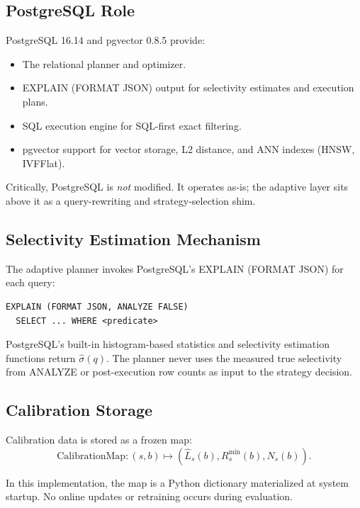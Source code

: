 \documentclass[10pt,twocolumn]{article}
\begin{document}
\subsection{PostgreSQL Role}

PostgreSQL 16.14 and pgvector 0.8.5 provide:
\begin{itemize}
\item The relational planner and optimizer.
\item EXPLAIN (FORMAT JSON) output for selectivity estimates and execution plans.
\item SQL execution engine for SQL-first exact filtering.
\item pgvector support for vector storage, L2 distance, and ANN indexes (HNSW, IVFFlat).
\end{itemize}

Critically, PostgreSQL is \emph{not} modified. It operates as-is; the adaptive layer sits above it as a query-rewriting and strategy-selection shim.

\subsection{Selectivity Estimation Mechanism}

The adaptive planner invokes PostgreSQL's EXPLAIN (FORMAT JSON) for each query:

\begin{verbatim}
EXPLAIN (FORMAT JSON, ANALYZE FALSE) 
  SELECT ... WHERE <predicate>
\end{verbatim}

PostgreSQL's built-in histogram-based statistics and selectivity estimation functions return $\hat{\sigma}(q)$. The planner never uses the measured true selectivity from ANALYZE or post-execution row counts as input to the strategy decision.

\subsection{Calibration Storage}

Calibration data is stored as a frozen map:
\begin{equation}
\text{CalibrationMap} : (s, b) \mapsto (\widehat{L}_s(b), R^{\min}_s(b), N_s(b)).
\end{equation}

In this implementation, the map is a Python dictionary materialized at system startup. No online updates or retraining occurs during evaluation.
\end{document}
